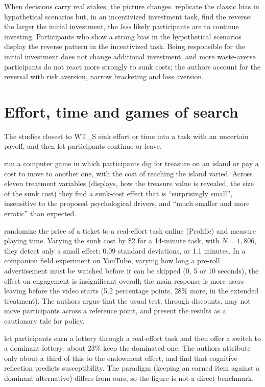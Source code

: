 \documentclass[11pt]{article}
\begin{document}
When decisions carry real stakes, the picture changes. \citet{negrini2022} replicate the classic bias in hypothetical scenarios but, in an incentivized investment task, find the reverse: the larger the initial investment, the \emph{less} likely participants are to continue investing. Participants who show a strong bias in the hypothetical scenarios display the reverse pattern in the incentivized task. Being responsible for the initial investment does not change additional investment, and more waste-averse participants do not react more strongly to sunk costs; the authors account for the reversal with risk aversion, narrow bracketing and loss aversion.

\section{Effort, time and games of search}

The studies closest to WT\_S sink effort or time into a task with an uncertain payoff, and then let participants continue or leave.

\citet{friedman2007} run a computer game in which participants dig for treasure on an island or pay a cost to move to another one, with the cost of reaching the island varied. Across eleven treatment variables (displays, how the treasure value is revealed, the size of the sunk cost) they find a sunk-cost effect that is ``surprisingly small'', insensitive to the proposed psychological drivers, and ``much smaller and more erratic'' than expected.

\citet{beknazar2025} randomize the price of a ticket to a real-effort task online (Prolific) and measure playing time. Varying the sunk cost by \$2 for a 14-minute task, with $N = 1{,}806$, they detect only a small effect: 0.09 standard deviations, or 1.1 minutes. In a companion field experiment on YouTube, varying how long a pre-roll advertisement must be watched before it can be skipped (0, 5 or 10 seconds), the effect on engagement is insignificant overall; the main response is more users leaving before the video starts (5.2 percentage points, 28\% more, in the extended treatment). The authors argue that the usual test, through discounts, may not move participants across a reference point, and present the results as a cautionary tale for policy.

\citet{ronayne2021} let participants earn a lottery through a real-effort task and then offer a switch to a dominant lottery: about 23\% keep the dominated one. The authors attribute only about a third of this to the endowment effect, and find that cognitive reflection predicts susceptibility. The paradigm (keeping an earned item against a dominant alternative) differs from ours, so the figure is not a direct benchmark.
\end{document}
